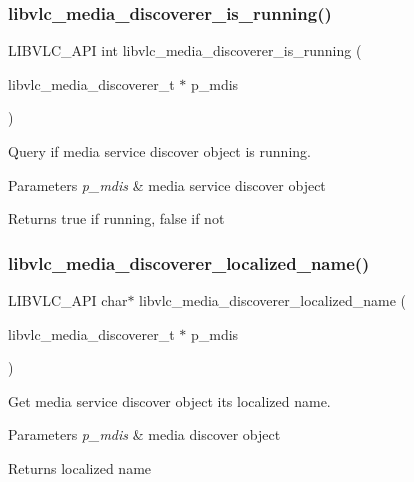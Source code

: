 \subsubsection{\texorpdfstring{libvlc\+\_\+media\+\_\+discoverer\+\_\+is\+\_\+running()}{libvlc\_media\_discoverer\_is\_running()}}
{\footnotesize\ttfamily L\+I\+B\+V\+L\+C\+\_\+\+A\+PI int libvlc\+\_\+media\+\_\+discoverer\+\_\+is\+\_\+running (\begin{DoxyParamCaption}\item[{libvlc\+\_\+media\+\_\+discoverer\+\_\+t $\ast$}]{p\+\_\+mdis }\end{DoxyParamCaption})}

Query if media service discover object is running.


\begin{DoxyParams}{Parameters}
{\em p\+\_\+mdis} & media service discover object \\
\hline
\end{DoxyParams}
\begin{DoxyReturn}{Returns}
true if running, false if not
\end{DoxyReturn}
\mbox{\label{group__libvlc__media__discoverer_ga27a1fcfeceedcb2649a92c83f7081617}} 
\subsubsection{\texorpdfstring{libvlc\+\_\+media\+\_\+discoverer\+\_\+localized\+\_\+name()}{libvlc\_media\_discoverer\_localized\_name()}}
{\footnotesize\ttfamily L\+I\+B\+V\+L\+C\+\_\+\+A\+PI char$\ast$ libvlc\+\_\+media\+\_\+discoverer\+\_\+localized\+\_\+name (\begin{DoxyParamCaption}\item[{libvlc\+\_\+media\+\_\+discoverer\+\_\+t $\ast$}]{p\+\_\+mdis }\end{DoxyParamCaption})}

Get media service discover object its localized name.


\begin{DoxyParams}{Parameters}
{\em p\+\_\+mdis} & media discover object \\
\hline
\end{DoxyParams}
\begin{DoxyReturn}{Returns}
localized name 
\end{DoxyReturn}
\mbox{\label{group__libvlc__media__discoverer_gad6a6daa2d4a4ce2634969380b4b6151c}} 
